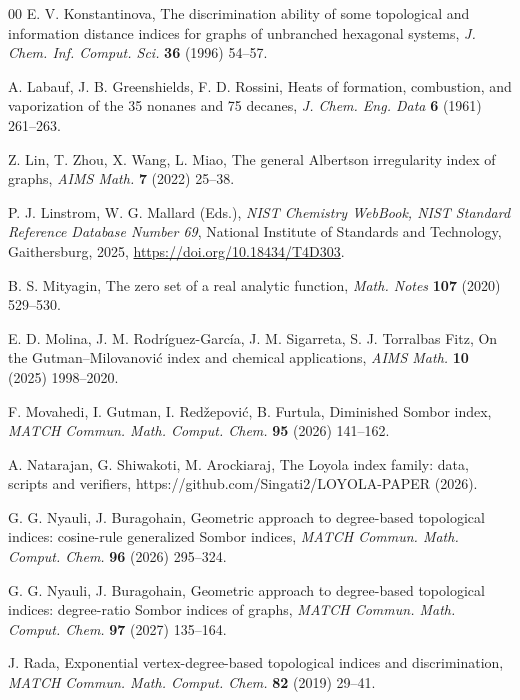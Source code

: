 \documentclass[a5paper, 10pt]{article}
\theoremstyle{plain}
\theoremstyle{remark}
\theoremstyle{definition}
\begin{document}
\begin{thebibliography}{00}
   E. V. Konstantinova, The
  discrimination ability of some topological and information distance indices
  for graphs of unbranched hexagonal systems, \textit{J. Chem. Inf. Comput.
  Sci.\/} \textbf{36} (1996) 54--57.

   A. Labauf, J. B. Greenshields,
  F. D. Rossini, Heats of formation, combustion, and vaporization of the
  35 nonanes and 75 decanes, \textit{J. Chem. Eng. Data\/} \textbf{6}
  (1961) 261--263.

   Z. Lin, T. Zhou, X. Wang, L. Miao, The general
  Albertson irregularity index of graphs, \textit{AIMS Math.\/} \textbf{7}
  (2022) 25--38.

   P. J. Linstrom, W. G. Mallard (Eds.), \textit{NIST
  Chemistry WebBook, NIST Standard Reference Database Number 69\/}, National
  Institute of Standards and Technology, Gaithersburg, 2025,
  \url{https://doi.org/10.18434/T4D303}.

   B. S. Mityagin, The zero set of a real analytic
  function, \textit{Math. Notes\/} \textbf{107} (2020) 529--530.

   E. D. Molina, J. M.
  Rodr\'iguez-Garc\'ia, J. M. Sigarreta, S. J. Torralbas Fitz, On the
  Gutman--Milovanovi\'c index and chemical applications, \textit{AIMS
  Math.\/} \textbf{10} (2025) 1998--2020.

   F. Movahedi, I. Gutman, I.
  Red\v{z}epovi\'c, B. Furtula, Diminished Sombor index, \textit{MATCH Commun.
  Math. Comput. Chem.\/} \textbf{95} (2026) 141--162.

   A. Natarajan, G. Shiwakoti, M. Arockiaraj,
  The Loyola index family: data, scripts and verifiers,
  https://github.com/Singati2/LOYOLA-PAPER (2026).

   G. G. Nyauli, J. Buragohain, Geometric
  approach to degree-based topological indices: cosine-rule generalized
  Sombor indices, \textit{MATCH Commun. Math. Comput. Chem.\/} \textbf{96}
  (2026) 295--324.

   G. G. Nyauli, J. Buragohain,
  Geometric approach to degree-based topological indices: degree-ratio
  Sombor indices of graphs, \textit{MATCH Commun. Math. Comput. Chem.\/}
  \textbf{97} (2027) 135--164.

   J. Rada, Exponential vertex-degree-based
  topological indices and discrimination, \textit{MATCH Commun. Math.
  Comput. Chem.\/} \textbf{82} (2019) 29--41.


\end{thebibliography}
\end{document}
